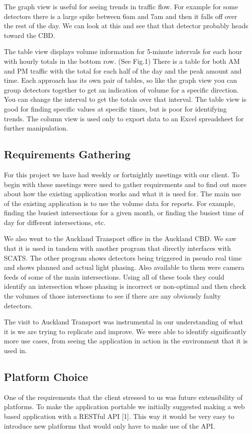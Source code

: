 \documentclass{article}
\begin{document}
The graph view is useful for seeing trends in traffic flow.
For example for some detectors there is a large spike between
6am and 7am and then it falls off over the rest of the day. We
can look at this and see that that detector probably heads
toward the CBD.

The table view displays volume information for 5-minute
intervals for each hour with hourly totals in the bottom row.
(See Fig.1) There is a table for both AM and PM traffic with
the total for each half of the day and the peak amount and
time. Each approach has its own pair of tables, so like the
graph view you can group detectors together to get an
indication of volume for a specific direction. You can change
the interval to get the totals over that interval.
The table view is good for finding specific values at
specific times, but is poor for identifying trends.
The column view is used only to export data to an Excel
spreadsheet for further manipulation.

\subsection{Requirements Gathering}
For this project we have had weekly or fortnightly
meetings with our client. To begin with these meetings were
used to gather requirements and to find out more about how
the existing application works and what it is used for.
The main use of the existing application is to use the
volume data for reports. For example, finding the busiest
intersections for a given month, or finding the busiest time of
day for different intersections, etc.

We also went to the Auckland Transport office in the
Auckland CBD. We saw that it is used in tandem with another
program that directly interfaces with SCATS. The other
program shows detectors being triggered in pseudo real time
and shows planned and actual light phasing. Also available to
them were camera feeds of some of the main intersections.
Using all of these tools they could identify an intersection
whose phasing is incorrect or non-optimal and then check the
volumes of those intersections to see if there are any obviously
faulty detectors.

The visit to Auckland Transport was instrumental in our
understanding of what it is we are trying to replicate and
improve. We were able to identify significantly more use
cases, from seeing the application in action in the environment
that it is used in.

\subsection{Platform Choice}
One of the requirements that the client stressed to us was
future extensibility of platforms. To make the application
portable we initially suggested making a web based
application with a RESTful API [1]. This way it would be
very easy to introduce new platforms that would only have to
make use of the API.
\end{document}
